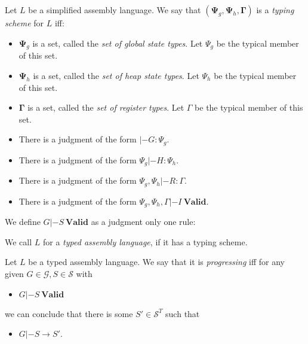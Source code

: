 \begin{definition}
  Let $L$ be a simplified assembly language. We say that
  $(\mathbf{\Psi}_g, \mathbf{\Psi}_h, \mathbf{\Gamma})$ is a \emph{typing
    scheme} for $L$ iff:

  \begin{itemize}
  \item $\mathbf{\Psi}_g$ is a set, called the \emph{set of global state
      types}. Let $\Psi_g$ be the typical member of this set.
  \item $\mathbf{\Psi}_h$ is a set, called the \emph{set of heap state
      types}. Let $\Psi_h$ be the typical member of this set.
  \item $\mathbf{\Gamma}$ is a set, called the \emph{set of register types}. Let
    $\Gamma$ be the typical member of this set.
  \item There is a judgment of the form $|- G : \Psi_g$.
  \item There is a judgment of the form $\Psi_g |- H : \Psi_h$.
  \item There is a judgment of the form $\Psi_g , \Psi_h |- R : \Gamma$.
  \item There is a judgment of the form
    $\Psi_g , \Psi_h , \Gamma |- I\ \mathbf{Valid}$.
  \end{itemize}

  We define $G |- S\ \mathbf{Valid}$ as a judgment only one rule:
  \begin{mathpar}
  \end{mathpar}

  We call $L$ for a \emph{typed assembly language}, if it has a typing scheme.
\end{definition}

\begin{definition}
  Let $L$ be a typed assembly language. We say that it is \emph{progressing} iff
  for any given $G \in \mathcal{G}, S \in \mathcal{S}$ with

  \begin{itemize}
  \item $G |- S\ \mathbf{Valid}$
  \end{itemize}

  we can conclude that there is some $S' \in \mathcal{S}^T$ such that

  \begin{itemize}
  \item $G |- S \to S'$.
  \end{itemize}
\end{definition}

